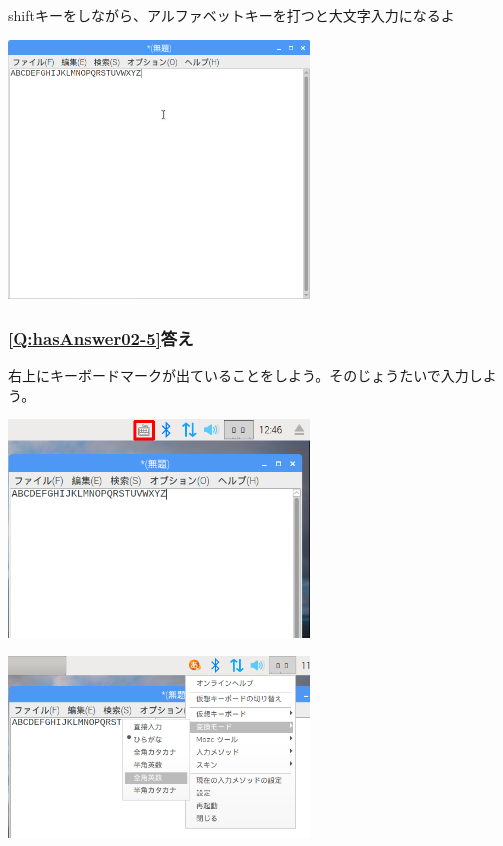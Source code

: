\documentclass[a4paper,12pt]{jarticle}
\begin{document}
shiftキーをしながら、アルファベットキーを打つと大文字入力になるよ


\centering
\includegraphics[width=0.6\textwidth]{textbook-img217.png}
\flushleft

\clearpage\subsubsection{\bfseries
\ref*{Q:hasAnswer02-5}答え}

右上にキーボードマークが出ていることをしよう。そのじょうたいで入力しよう。


\bigskip


\centering
\includegraphics[width=0.6\textwidth]{textbook-img218.png}
\flushleft


\bigskip





\centering
\includegraphics[width=0.6\textwidth]{textbook-img219.png}
\flushleft
\end{document}
